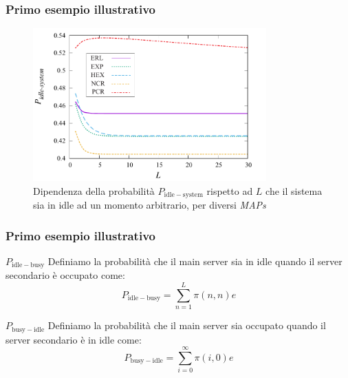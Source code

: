 \documentclass{beamer}
\begin{document}
\begin{frame}
    \frametitle{Primo esempio illustrativo}
    \begin{figure}[h]
        \centering
        \includegraphics[width=0.8\textwidth]{pSUZiNk.png}
        \caption{Dipendenza della probabilità $P_{\mathrm{idle-system}}$ rispetto ad $L$ che il sistema sia in idle ad un momento arbitrario, per diversi \emph{MAPs}}
        \label{fig:3}
    \end{figure}
\end{frame}



\begin{frame}
    \frametitle{Primo esempio illustrativo}
    \begin{block}{$P_{\mathrm{idle-busy}}$}
        Definiamo la probabilità che il main server sia in idle quando il server secondario è occupato come:
        $$ P_{\mathrm{idle-busy}} = \sum_{n=1}^{L} \pi(n,n) e $$
    \end{block}
    \begin{block}{$P_{\mathrm{busy-idle}}$}
        Definiamo la probabilità che il main server sia occupato quando il server secondario è in idle come:
        $$ P_{\mathrm{busy-idle}} = \sum_{i=0}^{\infty} \pi(i,0) e $$
    \end{block}
\end{frame}
\end{document}

